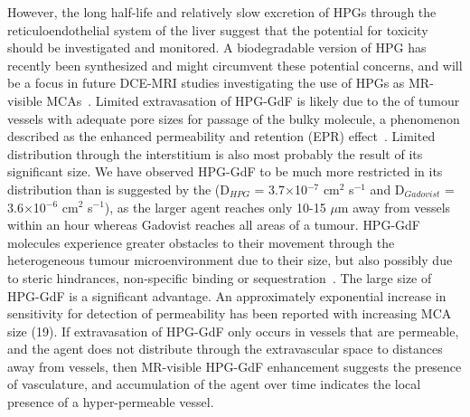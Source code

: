 However, the long half-life and relatively slow excretion of HPGs through the reticuloendothelial system of the liver suggest that the potential for toxicity should be investigated and monitored.
A biodegradable version of HPG has recently been synthesized and might circumvent these potential concerns, and will be a focus in future \acs{DCE-MRI} studies investigating the use of HPGs as MR-visible \acs{MCA}s~\cite{Shenoi:2013id}.
Limited extravasation of \acs{HPG-GdF} is likely due to the  of tumour vessels with adequate pore sizes for passage of the bulky molecule, a phenomenon described as the enhanced permeability and retention (\acs{EPR}) effect~\cite{Maeda:2013hq}.
Limited distribution through the interstitium is also most probably the result of its significant size.
We have observed \acs{HPG-GdF} to be much more restricted in its distribution than is suggested by the  (D$_{HPG}$ = 3.7$\times$10$^{-7}$ cm$^2$ s$^{-1}$ and D$_{Gadovist}$ = 3.6$\times$10$^{-6}$ cm$^2$ s$^{-1}$), as the larger agent reaches only 10-15 $\mu$m away from vessels within an hour whereas Gadovist reaches all areas of a tumour.
\acs{HPG-GdF} molecules experience greater obstacles to their movement through the heterogeneous tumour microenvironment due to their size, but also possibly due to steric hindrances, non-specific binding or sequestration~\cite{Minchinton:2006gs}.
The large size of \acs{HPG-GdF} is a significant advantage.
An approximately exponential increase in sensitivity for detection of permeability has been reported with increasing MCA size (19).
If extravasation of \acs{HPG-GdF} only occurs in vessels that are permeable, and the agent does not distribute through the extravascular space to distances away from vessels, then MR-visible \acs{HPG-GdF} enhancement suggests the presence of vasculature, and accumulation of the agent over time indicates the local presence of a hyper-permeable vessel.

